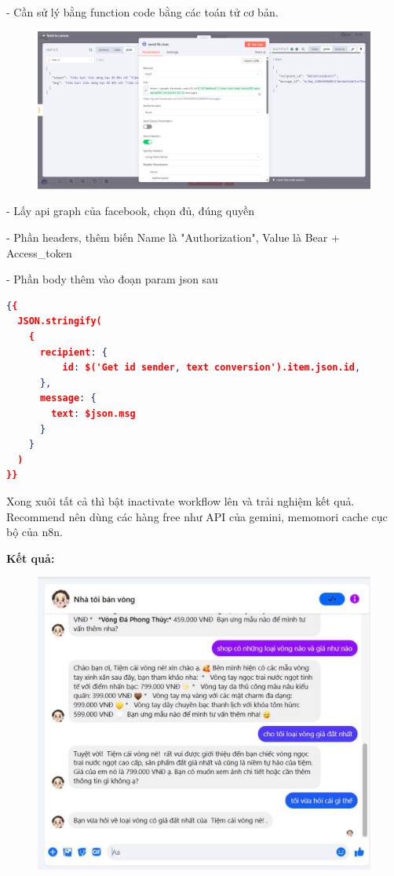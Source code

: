 - Cần sử lý bằng function code bằng các toán tử cơ bản.

\begin{figure}[htbp]
    \centering
    \includegraphics[width=1\linewidth]{Chap1-7/send-fb.pdf}
\end{figure}

- Lấy api graph của facebook, chọn đủ, đúng quyền

- Phần headers, thêm biến Name là "Authorization", Value là Bear + Access\_token

- Phần body thêm vào đoạn param json sau

\begin{lstlisting}[language = Json]
{{ 
  JSON.stringify(
    {
      recipient: { 
          id: $('Get id sender, text conversion').item.json.id,
      },
      message: {
        text: $json.msg
      }
    }
  )
}}
\end{lstlisting}

Xong xuôi tất cả thì bật inactivate workflow lên và trải nghiệm kết quả. Recommend nên dùng các hàng free như API của gemini, memomori cache cục bộ của n8n. 

\newpage 
\textbf{Kết quả: }

\begin{figure}[htbp]
    \centering
    \includegraphics[width=1\linewidth]{Chap1-7/result-mess.pdf}
\end{figure}

